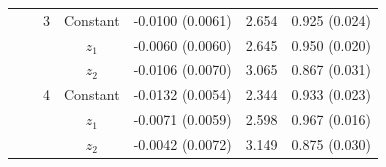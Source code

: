 \begin{tabular}{llccccc}
\addlinespace
 &  & 3 & Constant & -0.0100 (0.0061) & 2.654 & 0.925 (0.024) \\
 &  &  & $z_1$ & -0.0060 (0.0060) & 2.645 & 0.950 (0.020) \\
 &  &  & $z_2$ & -0.0106 (0.0070) & 3.065 & 0.867 (0.031) \\
\addlinespace
 &  & 4 & Constant & -0.0132 (0.0054) & 2.344 & 0.933 (0.023) \\
 &  &  & $z_1$ & -0.0071 (0.0059) & 2.598 & 0.967 (0.016) \\
 &  &  & $z_2$ & -0.0042 (0.0072) & 3.149 & 0.875 (0.030) \\
\bottomrule
\end{tabular}
